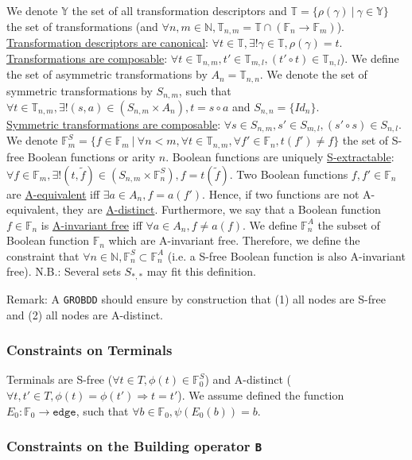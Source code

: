 \documentclass[a4paper,10pt]{article}
\newcommand{\N}{\mathbb{N}}%
\newcommand{\F}{\mathbb{F}}
\newcommand{\Y}{\mathbb{Y}}
\newcommand{\T}{\mathbb{T}}
\newcommand{\GroBdd}{\texttt{GROBDD}}
\begin{document}
We denote $\Y$ the set of all transformation descriptors and $\T=\{\rho(\gamma)~|~\gamma\in\Y\}$ the set of transformations (and $\forall n, m\in\N, \T_{n, m} = \T \cap (\F_n \longrightarrow \F_m)$).
\underline{Transformation descriptors are canonical}: $\forall t\in\T, \exists! \gamma\in\T, \rho(\gamma)=t$.\\
\underline{Transformations are composable}: $\forall t\in\T_{n, m}, t'\in\T_{m ,l}, (t' \circ t) \in \T_{n, l}$).
We define the set of asymmetric transformations by $A_n = \T_{n, n}$.
We denote the set of symmetric transformations by $S_{n, m}$, such that $\forall t\in\T_{n, m}, \exists!(s, a)\in(S_{n, m}\times A_n), t = s \circ a$ and $S_{n, n} = \{Id_n\}$.\\
\underline{Symmetric transformations are composable}: $\forall s\in S_{n, m}, s'\in S_{m ,l}, (s' \circ s) \in S_{n, l}$.
We denote $\F^S_m = \{f\in\F_m~|~\forall n < m, \forall t\in\T_{n, m}, \forall f'\in\F_n, t(f') \neq f\}$ the set of S-free Boolean functions or arity $n$.
Boolean functions are uniquely \underline{S-extractable}: $\forall f\in\F_m, \exists! (t, \tilde{f})\in \left( S_{n, m} \times \F^S_n \right), f = t(\tilde{f})$.
Two Boolean functions $f, f'\in\F_n$ are \underline{A-equivalent} iff $\exists a\in A_n, f=a(f')$.
Hence, if two functions are not A-equivalent, they are \underline{A-distinct}.
Furthermore, we say that a Boolean function $f\in\F_n$ is \underline{A-invariant free} iff $\forall a\in A_n, f\neq a(f)$.
We define $\F^A_n$ the subset of Boolean function $\F_n$ which are A-invariant free.
Therefore, we define the constraint that $\forall n\in\N, \F^S_n \subset \F^A_n$ (i.e. a S-free Boolean function is also A-invariant free).
N.B.: Several sets $S_{*, *}$ may fit this definition.

Remark: A \GroBdd{} should ensure by construction that (1) all nodes are S-free and (2) all nodes are A-distinct.

\subsubsection{Constraints on Terminals}
Terminals are S-free ($\forall t\in T, \phi(t)\in\F^S_0$) and A-distinct ($\forall t, t'\in T, \phi(t) = \phi(t') \Rightarrow t = t'$).
We assume defined the function $E_0: \F_0 \longrightarrow \mathtt{edge}$, such that $\forall b\in\F_0, \psi(E_0(b)) = b$. 


\subsubsection{Constraints on the Building operator \texttt{B}}
\end{document}
